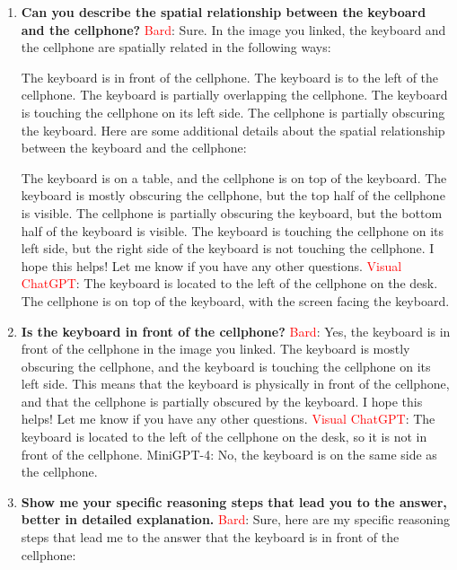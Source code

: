     \begin{enumerate}
        \item \textbf{Can you describe the spatial relationship between the keyboard and the cellphone?}
        \subitem \textcolor{Red}{Bard}: 
        Sure. In the image you linked, the keyboard and the cellphone are spatially related in the following ways:
        
        The keyboard is in front of the cellphone.
        The keyboard is to the left of the cellphone.
        The keyboard is partially overlapping the cellphone.
        The keyboard is touching the cellphone on its left side.
        The cellphone is partially obscuring the keyboard.
        Here are some additional details about the spatial relationship between the keyboard and the cellphone:
        
        The keyboard is on a table, and the cellphone is on top of the keyboard.
        The keyboard is mostly obscuring the cellphone, but the top half of the cellphone is visible.
        The cellphone is partially obscuring the keyboard, but the bottom half of the keyboard is visible.
        The keyboard is touching the cellphone on its left side, but the right side of the keyboard is not touching the cellphone.
        I hope this helps! Let me know if you have any other questions.
        \subitem \textcolor{red}{Visual ChatGPT}: The keyboard is located to the left of the cellphone on the desk.
        \subitem The cellphone is on top of the keyboard, with the screen facing the keyboard.
        \item \textbf{Is the keyboard in front of the cellphone?}
        \subitem \textcolor{Red}{Bard}: Yes, the keyboard is in front of the cellphone in the image you linked. The keyboard is mostly obscuring the cellphone, and the keyboard is touching the cellphone on its left side. This means that the keyboard is physically in front of the cellphone, and that the cellphone is partially obscured by the keyboard. I hope this helps! Let me know if you have any other questions.
        \subitem \textcolor{red}{Visual ChatGPT}: The keyboard is located to the left of the cellphone on the desk, so it is not in front of the cellphone.
        \subitem MiniGPT-4: No, the keyboard is on the same side as the cellphone.
        \item \textbf{Show me your specific reasoning steps that lead you to the answer, better in detailed explanation.}
        \subitem \textcolor{Red}{Bard}: Sure, here are my specific reasoning steps that lead me to the answer that the keyboard is in front of the cellphone:


\end{enumerate}
